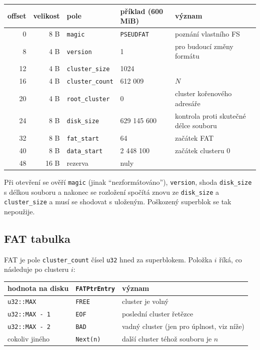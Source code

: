 \documentclass[10pt, a4paper]{report}
\newcommand{\code}[1]{\texttt{#1}}
\begin{document}
	\begin{table}[H]
		\centering
		\begin{tabular}{|r|r|l|l|p{4.5cm}|}
			\hline
			\textbf{offset} & \textbf{velikost} & \textbf{pole} & \textbf{příklad (600 MiB)} & \textbf{význam} \\ \hline
			0 & 8 B & \code{magic} & \code{PSEUDFAT} & poznání vlastního FS \\ \hline
			8 & 4 B & \code{version} & 1 & pro budoucí změny formátu \\ \hline
			12 & 4 B & \code{cluster\_size} & 1024 & \\ \hline
			16 & 4 B & \code{cluster\_count} & 612 009 & $N$ \\ \hline
			20 & 4 B & \code{root\_cluster} & 0 & cluster kořenového adresáře \\ \hline
			24 & 8 B & \code{disk\_size} & 629 145 600 & kontrola proti skutečné délce souboru \\ \hline
			32 & 8 B & \code{fat\_start} & 64 & začátek FAT \\ \hline
			40 & 8 B & \code{data\_start} & 2 448 100 & začátek clusteru 0 \\ \hline
			48 & 16 B & rezerva & nuly & \\ \hline
		\end{tabular}
	\end{table}
	
	Při otevření se ověří \code{magic} (jinak \enquote{nezformátováno}), \code{version},
	shoda \code{disk\_size} s délkou souboru a nakonec se rozložení spočítá znovu ze
	\code{disk\_size} a \code{cluster\_size} a musí se shodovat s uloženým. Poškozený superblok
	se tak nepoužije.
	
	\subsection{FAT tabulka}
	
	FAT je pole \code{cluster\_count} čísel \code{u32} hned za superblokem. Položka $i$ říká, co
	následuje po clusteru $i$:
	
	\begin{table}[H]
		\centering
		\begin{tabular}{|l|l|l|}
			\hline
			\textbf{hodnota na disku} & \textbf{\code{FATPtrEntry}} & \textbf{význam} \\ \hline
			\code{u32::MAX} & \code{FREE} & cluster je volný \\ \hline
			\code{u32::MAX - 1} & \code{EOF} & poslední cluster řetězce \\ \hline
			\code{u32::MAX - 2} & \code{BAD} & vadný cluster (jen pro úplnost, viz níže) \\ \hline
			cokoliv jiného & \code{Next(n)} & další cluster téhož souboru je $n$ \\ \hline
		\end{tabular}
	\end{table}
	
\end{document}
